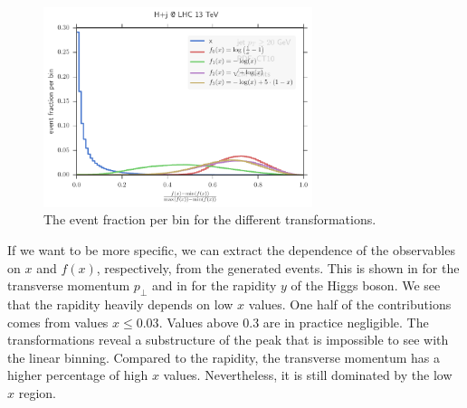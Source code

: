 %
\begin{figure}[]
	\includegraphics[width=0.7\textwidth]{images/x_compare.pdf}
	\caption{The event fraction per bin for the different transformations.}
	\label{fig:x_compare}
\end{figure}
%

If we want to be more specific, we can extract the dependence of the observables on $x$ and $f(x)$, respectively, from the generated events.
This is shown in  for the transverse momentum $p_\perp$ and in  for the rapidity $y$ of the Higgs boson.
We see that the rapidity heavily depends on low $x$ values.
One half of the contributions comes from values $x \leq \num{0.03}$.
Values above \num{0.3} are in practice negligible.
The transformations reveal a substructure of the peak that is impossible to see with the linear binning.
Compared to the rapidity, the transverse momentum has a higher percentage of high $x$ values.
Nevertheless, it is still dominated by the low $x$ region.

